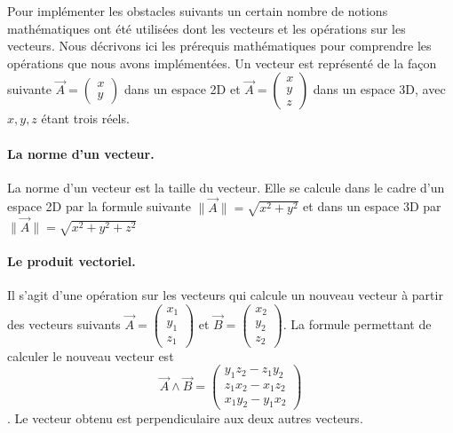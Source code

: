 \documentclass{article}
\begin{document}
Pour implémenter les obstacles suivants un certain nombre de notions mathématiques ont été utilisées dont les vecteurs et les opérations sur les vecteurs.
Nous décrivons ici les prérequis mathématiques pour comprendre les opérations que nous avons implémentées.
Un vecteur est représenté de la façon suivante $\overrightarrow{A}=\left(\begin{array}{c}x \\ y \end{array}\right)$ dans un espace 2D et $\overrightarrow{A}=\left(\begin{array}{c}x \\ y\\ z \end{array}\right)$ dans un espace 3D, avec $x,y,z$ étant trois réels.

\paragraph{La norme d'un vecteur.}

La norme d'un vecteur est la taille du vecteur. Elle se calcule dans le cadre d'un espace 2D par la formule suivante $\|\overrightarrow{A}\|=\sqrt{x^2+y^2}$ et dans un espace 3D par  $\|\overrightarrow{A}\|=\sqrt{x^2+y^2+z^2}$

\paragraph{Le produit vectoriel.}

Il s'agit d'une opération sur les vecteurs qui calcule un nouveau vecteur à partir des vecteurs suivants $\overrightarrow{A}=\left(\begin{array}{c}x_1 \\ y_1\\ z_1 \end{array}\right)$ et $\overrightarrow{B}=\left(\begin{array}{c}x_2 \\ y_2\\ z_2 \end{array}\right)$. \medskip
La formule permettant de calculer le nouveau vecteur est $$\overrightarrow{A}\wedge\overrightarrow{B}=\left(\begin{array}{c}y_1z_2-z_1y_2\\z_1x_2-x_1z_2\\x_1y_2-y_1x_2   \end{array}\right)$$.\medskip
Le vecteur obtenu est perpendiculaire aux deux autres vecteurs.
\end{document}
